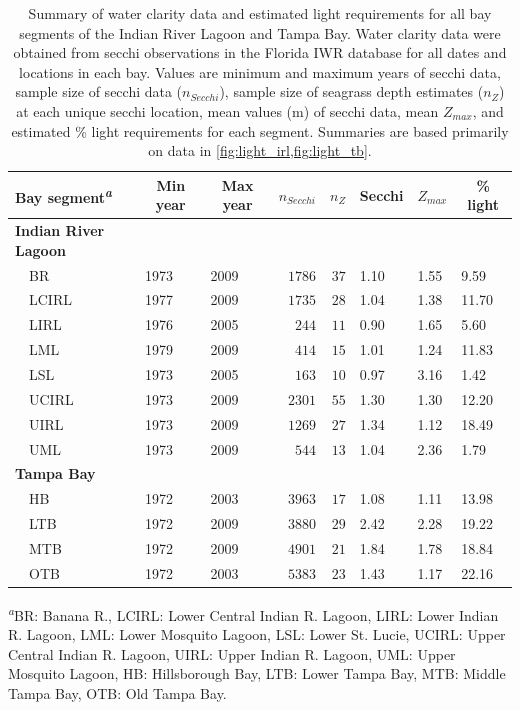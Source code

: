 \documentclass[letterpaper,12pt,oneside]{article}\usepackage[]{graphicx}\usepackage[]{color}
\begin{document}
\begin{table}[!tbp]
\caption{Summary of water clarity data and estimated light requirements for all bay segments of the Indian River Lagoon and Tampa Bay.  Water clarity data were obtained from secchi observations in the Florida \acl{IWR} database for all dates and locations in each  bay.  Values are minimum and maximum years of secchi data, sample size of secchi data ($n_{Secchi}$), sample size of seagrass depth estimates ($n_{Z}$) at each unique secchi location, mean values (m) of secchi data, mean $Z_{max}$, and estimated \% light requirements for each segment.  Summaries are based primarily on data in \cref{fig:light_irl,fig:light_tb}.\label{tab:secc_summ}} 
\begin{center}
\begin{tabular}{lllrrlll}
\hline\hline
\multicolumn{1}{l}{Bay segment\textsuperscript{\textit{a}}}&\multicolumn{1}{c}{Min year}&\multicolumn{1}{c}{Max year}&\multicolumn{1}{c}{$n_{Secchi}$}&\multicolumn{1}{c}{$n_{Z}$}&\multicolumn{1}{c}{Secchi}&\multicolumn{1}{c}{$Z_{max}$}&\multicolumn{1}{c}{\% light}\tabularnewline
\hline
{\bfseries Indian River Lagoon}&&&&&&&\tabularnewline
~~BR&1973&2009&$1786$&$37$&1.10&1.55& 9.59\tabularnewline
~~LCIRL&1977&2009&$1735$&$28$&1.04&1.38&11.70\tabularnewline
~~LIRL&1976&2005&$ 244$&$11$&0.90&1.65& 5.60\tabularnewline
~~LML&1979&2009&$ 414$&$15$&1.01&1.24&11.83\tabularnewline
~~LSL&1973&2005&$ 163$&$10$&0.97&3.16& 1.42\tabularnewline
~~UCIRL&1973&2009&$2301$&$55$&1.30&1.30&12.20\tabularnewline
~~UIRL&1973&2009&$1269$&$27$&1.34&1.12&18.49\tabularnewline
~~UML&1973&2009&$ 544$&$13$&1.04&2.36& 1.79\tabularnewline
\hline
{\bfseries Tampa Bay}&&&&&&&\tabularnewline
~~HB&1972&2003&$3963$&$17$&1.08&1.11&13.98\tabularnewline
~~LTB&1972&2009&$3880$&$29$&2.42&2.28&19.22\tabularnewline
~~MTB&1972&2009&$4901$&$21$&1.84&1.78&18.84\tabularnewline
~~OTB&1972&2003&$5383$&$23$&1.43&1.17&22.16\tabularnewline
\hline
\end{tabular}\end{center}

\textsuperscript{\textit{a}}\footnotesize BR: Banana R., LCIRL: Lower Central Indian R. Lagoon, LIRL: Lower Indian R. Lagoon, LML: Lower Mosquito Lagoon, LSL: Lower St. Lucie, UCIRL: Upper Central Indian R. Lagoon, UIRL: Upper Indian R. Lagoon, UML: Upper Mosquito Lagoon, HB: Hillsborough Bay, LTB: Lower Tampa Bay, MTB: Middle Tampa Bay, OTB: Old Tampa Bay.\end{table}
\end{document}
